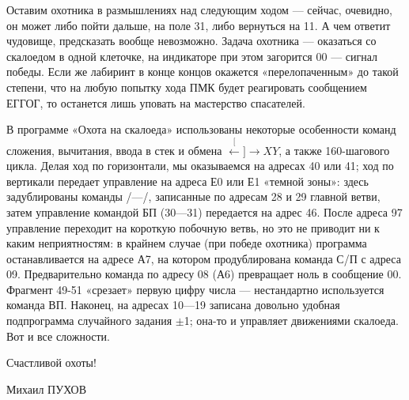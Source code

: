 \documentclass[11pt,a4paper,oneside]{article}
\def\XY{$\stackrel[\leftarrow]{\rightarrow}{XY}$}
\begin{document}
Оставим охотника в размышлениях над следующим ходом — сейчас, очевидно, он может либо пойти дальше, на поле 31, либо вернуться на 11. А чем ответит чудовище, предсказать вообще невозможно. Задача охотника — оказаться со скалоедом в одной клеточке, на индикаторе при этом загорится 00 — сигнал победы. Если же лабиринт в конце концов окажется «перелопаченным» до такой степени, что на любую попытку хода ПМК будет реагировать сообщением ЕГГОГ, то останется лишь уповать на мастерство спасателей.

В программе «Охота на скалоеда» использованы некоторые особенности команд сложения, вычитания, ввода в стек и обмена \XY, а также 160-шагового цикла. Делая ход по горизонтали, мы оказываемся на адресах 40 или 41; ход по вертикали передает управление на адреса Е0 или Е1 «темной зоны»: здесь задублированы команды /—/, записанные по адресам 28 и 29 главной ветви, затем управление командой БП (30—31) передается на адрес 46. После адреса 97 управление переходит на короткую побочную ветвь, но это не приводит ни к каким неприятностям: в крайнем случае (при победе охотника) программа останавливается на адресе А7, на котором продублирована команда С/П с адреса 09. Предварительно команда по адресу 08 (А6) превращает ноль в сообщение 00. Фрагмент 49-51 «срезает» первую цифру числа — нестандартно используется команда ВП. Наконец, на адресах 10—19 записана довольно удобная подпрограмма случайного задания $\pm$1; она-то и управляет движениями скалоеда. Вот и все сложности.

Счастливой охоты!

Михаил ПУХОВ
\end{document}
